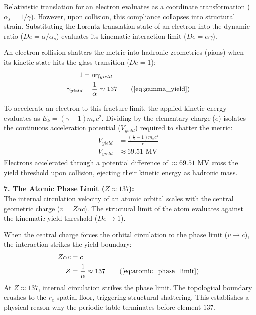 Relativistic translation for an electron evaluates as a coordinate transformation ($\alpha_s = 1/\gamma$). However, upon collision, this compliance collapses into structural strain. Substituting the Lorentz translation state of an electron into the dynamic ratio ($De = \alpha / \alpha_s$) evaluates its kinematic interaction limit ($De = \alpha \gamma$). 

An electron collision shatters the metric into hadronic geometries (pions) when its kinetic state hits the glass transition ($De = 1$): 
\begin{align}
    1 &= \alpha \gamma_{yield} \\
    \gamma_{yield} &= \frac{1}{\alpha} \approx 137 \tag{\ref{eq:gamma_yield}}
\end{align}

To accelerate an electron to this fracture limit, the applied kinetic energy evaluates as $E_k = (\gamma - 1) m_e c^2$. Dividing by the elementary charge ($e$) isolates the continuous acceleration potential ($V_{yield}$) required to shatter the metric:
\begin{align}
    V_{yield} &= \frac{\left(\frac{1}{\alpha} - 1\right) m_e c^2}{e} \\ 
    V_{yield} &\approx 69.51 \text{ MV} 
\end{align}
Electrons accelerated through a potential difference of $\approx 69.51 \text{ MV}$ cross the yield threshold upon collision, ejecting their kinetic energy as hadronic mass.

\vspace{0.2 cm}

\textbf{7. The Atomic Phase Limit ($Z \approx 137$):} \\ 
The internal circulation velocity of an atomic orbital scales with the central geometric charge ($v = Z \alpha c$). The structural limit of the atom evaluates against the kinematic yield threshold ($De \to 1$). 

When the central charge forces the orbital circulation to the phase limit ($v \to c$), the interaction strikes the yield boundary: 
\begin{align}
    Z \alpha c &= c \\
    Z &= \frac{1}{\alpha} \approx 137 \tag{\ref{eq:atomic_phase_limit}}
\end{align}
At $Z \approx 137$, internal circulation strikes the phase limit. The topological boundary crushes to the $r_e$ spatial floor, triggering structural shattering. This establishes a physical reason why the periodic table terminates before element $137$. 

